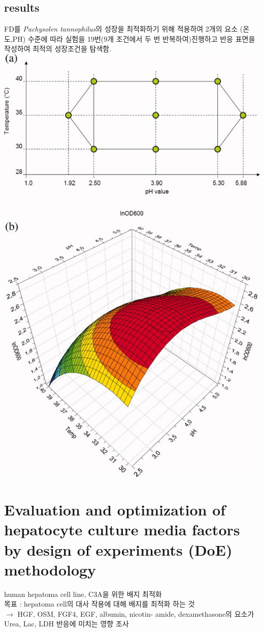\documentclass{article}
\begin{document}
\subsection{results}
FD를 \textit{Pachysolen tannophilus}의 성장을 최적화하기 위해 적용하여 2개의 요소 (온도,PH) 수준에 따라 실험을 19번(9개 조건에서 두 번 반복하여)진행하고 반응 표면을 작성하여 최적의 성장조건을 탐색함.\\
\includegraphics[scale=0.3]{fd.jpg}
\newpage
\section{Evaluation and optimization of hepatocyte culture media
factors by design of experiments (DoE) methodology\cite{dong2008evaluation}}
human hepatoma cell line, C3A을 위한 배지 최적화 \\
목표 : hepatoma cell의 대사 작용에 대해 배지를 최적화 하는 것\\
$\rightarrow$ HGF, OSM, FGF4, EGF, albumin, nicotin-
amide, dexamethasone의 요소가 Urea, Lac, LDH 반응에 미치는 영향 조사
\end{document}
